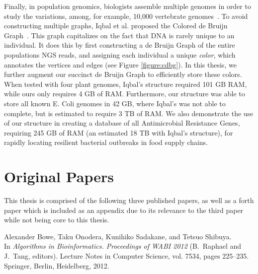 Finally, in population genomics, biologists assemble multiple genomes in order to study the variations, among, for example, 10,000 vertebrate genomes~\citep{Haussler:2009}. To avoid constructing multiple graphs, Iqbal et al. proposed the Colored de Bruijn Graph~\cite{ICTFM12}. This graph capitalizes on the fact that DNA is rarely unique to an individual. It does this by first constructing a de Bruijn Graph of the entire populations NGS reads, and assigning each individual a unique \emph{color}, which annotates the vertices and edges (see Figure \ref{figure:cdbg}). In this thesis, we further augment our succinct de Bruijn Graph to efficiently store these colors. When tested with four plant genomes, Iqbal’s structure required 101 GB RAM, while ours only requires 4 GB of RAM. Furthermore, our structure was able to store all known E. Coli genomes in 42 GB, where Iqbal’s was not able to complete, but is estimated to require 3 TB of RAM. We also demonstrate the use of our structure in creating a database of all Antimicrobial Resistance Genes, requiring 245 GB of RAM (an estimated 18 TB with Iqbal’s structure), for rapidly locating resilient bacterial outbreaks in food supply chains.



\section{Original Papers}

This thesis is comprised of the following three published papers, as well as a forth paper which is included as an appendix due to its relevance to the third paper while not being core to this thesis.


{Alexander Bowe, Taku Onodera, Kunihiko Sadakane, and Tetsuo Shibuya.\\
In \textit{Algorithms in Bioinformatics. Proceedings of WABI 2012} (B.~Raphael and J.~Tang, editors). 
Lecture Notes in Computer Science, vol. 7534, pages 225--235. 
Springer, Berlin, Heidelberg, 2012.}

